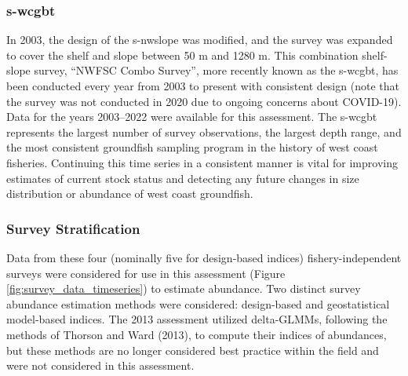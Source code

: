 \documentclass[11pt,
  english,
  letterpaper,
]{article}
\begin{document}
\hypertarget{section-1}{%
\subsubsection{\texorpdfstring{\acrlong{s-wcgbt}}{}}\label{section-1}}

In 2003, the design of the \gls{s-nwslope} was modified, and the survey was expanded to cover the shelf and slope between 50 m and 1280 m. This combination shelf-slope survey, ``NWFSC Combo Survey'', more recently known as the \gls{s-wcgbt}, has been conducted every year from 2003 to present with consistent design (note that the survey was not conducted in 2020 due to ongoing concerns about COVID-19). Data for the years 2003--2022 were available for this assessment. The \gls{s-wcgbt} represents the largest number of survey observations, the largest depth range, and the most consistent groundfish sampling program in the history of west coast fisheries. Continuing this time series in a consistent manner is vital for improving estimates of current stock status and detecting any future changes in size distribution or abundance of west coast groundfish.

\hypertarget{survey-stratification}{%
\subsubsection{Survey Stratification}\label{survey-stratification}}

Data from these four (nominally five for design-based indices) fishery-independent surveys were considered for use in this assessment (Figure \ref{fig:survey_data_timeseries}) to estimate abundance. Two distinct survey abundance estimation methods were considered: design-based and geostatistical model-based indices. The 2013 assessment utilized delta-GLMMs, following the methods of Thorson and Ward (2013), to compute their indices of abundances, but these methods are no longer considered best practice within the field and were not considered in this assessment.
\end{document}
